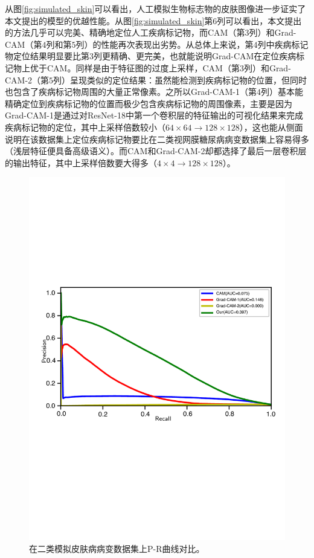 从图\ref{fig:simulated_skin}可以看出，人工模拟生物标志物的皮肤图像进一步证实了本文提出的模型的优越性能。从图\ref{fig:simulated_skin}第$6$列可以看出，本文提出的方法几乎可以完美、精确地定位人工疾病标记物，而CAM（第$3$列）和Grad-CAM（第$4$列和第$5$列）的性能再次表现出劣势。从总体上来说，第$4$列中疾病标记物定位结果明显要比第$3$列更精确、更完美，也就能说明Grad-CAM在定位疾病标记物上优于CAM。同样是由于特征图的过度上采样，CAM（第$3$列）和Grad-CAM-2（第$5$列）呈现类似的定位结果：虽然能检测到疾病标记物的位置，但同时也包含了疾病标记物周围的大量正常像素。之所以Grad-CAM-1（第$4$列）基本能精确定位到疾病标记物的位置而极少包含疾病标记物的周围像素，主要是因为Grad-CAM-1是通过对ResNet-18中第一个卷积层的特征输出的可视化结果来完成疾病标记物的定位，其中上采样倍数较小（$64\times 64\rightarrow 128\times 128$），这也能从侧面说明在该数据集上定位疾病标记物要比在二类视网膜糖尿病病变数据集上容易得多（浅层特征便具备高级语义）。而CAM和Grad-CAM-2却都选择了最后一层卷积层的输出特征，其中上采样倍数要大得多（$4\times4\rightarrow 128\times 128$）。
\begin{figure}[h]
	\centering
	\includegraphics[width=1.0\textwidth]{figure/pr_curve_skin_image/pr_curve}
	\caption[在二类模拟皮肤病病变数据集上P-R曲线对比]{在二类模拟皮肤病病变数据集上P-R曲线对比。}
	\label{fig:simulated_skin_pr_curve}
\end{figure}

